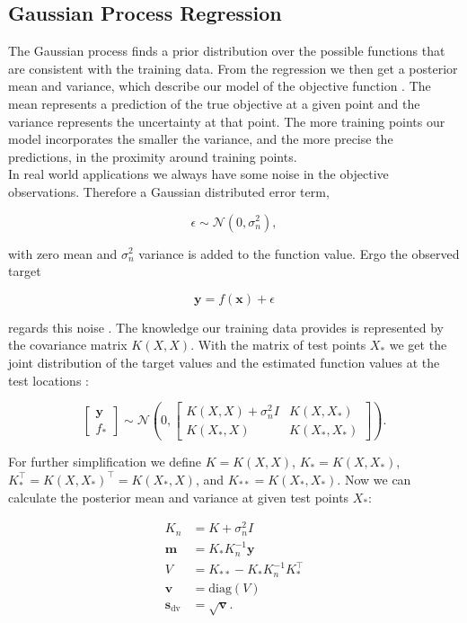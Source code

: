 \subsection{Gaussian Process Regression}
The Gaussian process finds a prior distribution over the possible functions that are consistent with the training data. From the regression we then get a posterior mean and variance, which describe our model of the objective function \cite{rasmussen2006gaussian}. The mean represents a prediction of the true objective at a given point and the variance represents the uncertainty at that point. The more training points our model incorporates the smaller the variance, and the more precise the predictions, in the proximity around training points.\\
In real world applications we always have some noise in the objective observations. Therefore a Gaussian distributed error term,

$$\epsilon \sim \mathcal{N}(0,\sigma_n^2),$$

with zero mean and $\sigma_n^2$ variance is added to the function value. Ergo the observed target

$$\mathbf{y} = f(\mathbf{x}) + \epsilon$$

regards this noise \cite{brochu2010tutorial,rasmussen2006gaussian,lizotte2008practical,shahriari2016taking}. The knowledge our training data provides is represented by the covariance matrix $K(X,X)$. With the matrix of test points $X_*$ we get the joint distribution of the target values and the estimated function values at the test locations \cite{rasmussen2006gaussian}:

$$\left[ \begin{array}{c} \mathbf{y} \\ f_* \end{array} \right] \sim \mathcal{N} \left(0, \begin{bmatrix} K(X,X)+\sigma_n^2 I & K(X,X_*) \\ K(X_*,X) & K(X_*,X_*) \end{bmatrix} \right).$$

For further simplification we define $K = K(X,X)$, $K_* = K(X,X_*)$, $K_*^{\top} = K(X,X_*)^{\top} = K(X_*,X)$, and $K_{**} = K(X_*,X_*)$. Now we can calculate the posterior mean and variance at given test points $X_*$:

\begin{align}
    K_n &= K+\sigma_n^2 I \label{eq:kNoise} \\
    \mathbf{m} &= K_*K_n^{-1}\mathbf{y} \label{eq:meanGauss} \\
    V &= K_{**}-K_*K_n^{-1}K_*^\top \label{eq:wholeVar} \\
    \mathbf{v} &= \mathrm{diag}(V) \label{eq:vectorVar} \\
    \mathbf{s}_\mathrm{dv} &= \sqrt{\mathbf{v}}. \label{eq:gp:stdv}\\ \nonumber
\end{align}

